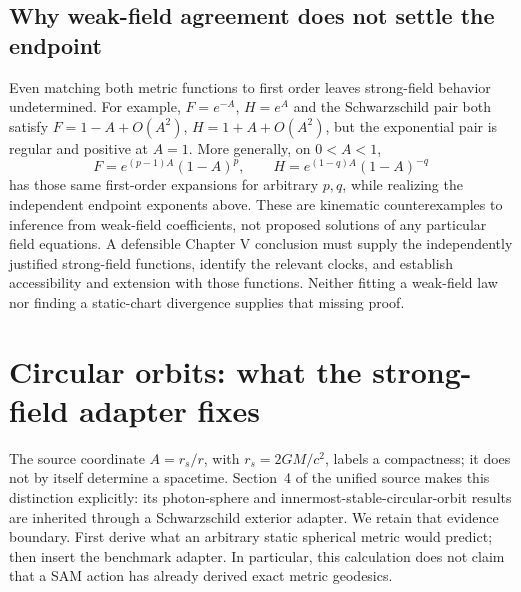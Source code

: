 \documentclass[10pt,twocolumn,letterpaper]{article}
\begin{document}
\subsection{Why weak-field agreement does not settle the endpoint}
Even matching both metric functions to first order leaves strong-field
behavior undetermined. For example, $F=e^{-A}$, $H=e^A$ and the
Schwarzschild pair both satisfy $F=1-A+O(A^2)$,
$H=1+A+O(A^2)$, but the exponential pair is regular and positive at $A=1$.
More generally, on $0<A<1$,
\begin{equation}
 F=e^{(p-1)A}(1-A)^p,\qquad
 H=e^{(1-q)A}(1-A)^{-q}
 \label{eq:ch5-weakfield-counterfamily}
\end{equation}
has those same first-order expansions for arbitrary $p,q$, while realizing
the independent endpoint exponents above. These are kinematic
counterexamples to inference from weak-field coefficients, not proposed
solutions of any particular field equations. A defensible Chapter V
conclusion must supply the independently justified strong-field functions,
identify the relevant clocks, and establish accessibility and extension
with those functions. Neither fitting a weak-field law nor finding a
static-chart divergence supplies that missing proof.


\section{Circular orbits: what the strong-field adapter fixes}
\label{sec:strong-orbits}
The source coordinate $A=r_s/r$, with $r_s=2GM/c^2$, labels a
compactness; it does not by itself determine a spacetime. Section~4 of
the unified source makes this distinction explicitly: its photon-sphere
and innermost-stable-circular-orbit results are inherited through a
Schwarzschild exterior adapter. We retain that evidence boundary.\cite{unified,tong}
First derive what an arbitrary static spherical metric would predict;
then insert the benchmark adapter. In particular, this calculation does
not claim that a SAM action has already derived exact metric geodesics.
\end{document}

